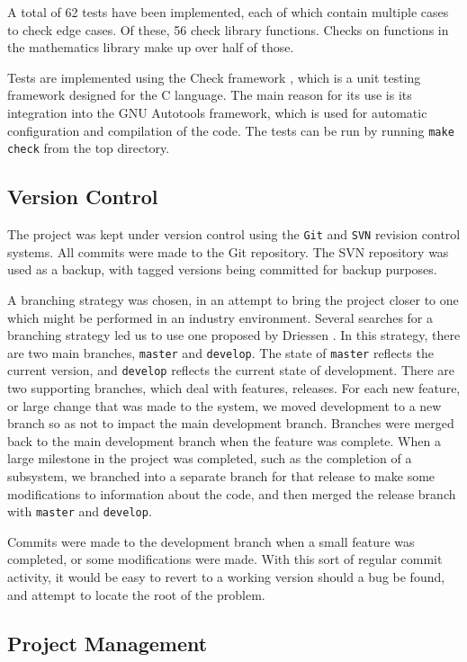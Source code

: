 \documentclass[a4paper,11pt,twoside]{article}
\begin{document}
   A total of 62 tests have been implemented, each of which contain multiple
   cases to check edge cases. Of these, 56 check library functions. Checks on
   functions in the mathematics library make up over half of those.

   Tests are implemented using the Check framework \cite{check}, which is a unit
   testing framework designed for the C language. The main reason for its use is
   its integration into the GNU Autotools framework, which is used for automatic
   configuration and compilation of the code. The tests can be run by running
   \texttt{make check} from the top directory.
\subsection{Version Control}
\label{sec-7-4}

   The project was kept under version control using the \texttt{Git} and
   \texttt{SVN} revision control systems. All commits were made to the Git
   repository. The SVN repository was used as a backup, with tagged versions
   being committed for backup purposes.

   A branching strategy was chosen, in an attempt to bring the project closer to
   one which might be performed in an industry environment. Several searches for
   a branching strategy led us to use one proposed by Driessen
   \cite{driessen}. In this strategy, there are two main branches,
   \texttt{master} and \texttt{develop}. The state of \texttt{master} reflects
   the current version, and \texttt{develop} reflects the current state of
   development. There are two supporting branches, which deal with features,
   releases. For each new feature, or large change that was made to the system,
   we moved development to a new branch so as not to impact the main development
   branch. Branches were merged back to the main development branch when the
   feature was complete. When a large milestone in the project was completed,
   such as the completion of a subsystem, we branched into a separate branch for
   that release to make some modifications to information about the code, and
   then merged the release branch with \texttt{master} and \texttt{develop}.

   Commits were made to the development branch when a small feature was
   completed, or some modifications were made. With this sort of regular commit
   activity, it would be easy to revert to a working version should a bug be
   found, and attempt to locate the root of the problem.
\subsection{Project Management}
\label{sec-7-5}
\end{document}
